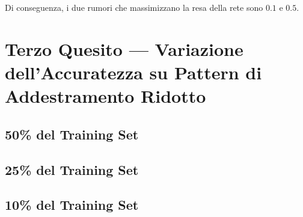 \documentclass[12pt, a4paper]{article}
\begin{document}
Di conseguenza, i due rumori che massimizzano la resa della rete sono \(0.1\) e \(0.5\).

\newpage
\section{Terzo Quesito --- Variazione dell'Accuratezza su Pattern di Addestramento Ridotto}
\subsection{50\% del Training Set}
\subsection{25\% del Training Set}
\subsection{10\% del Training Set}
\end{document}
